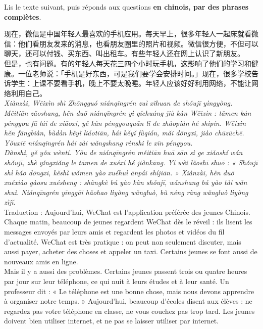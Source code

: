\documentclass[11pt]{article}
\begin{document}
\begin{exercice}
Lis le texte suivant, puis réponds aux questions \textbf{en chinois, par des phrases complètes}.

\begin{textebox}[微信和中国年轻人]
现在，微信是中国年轻人最喜欢的手机应用。每天早上，很多年轻人一起床就看微信：他们看朋友发来的消息，也看朋友圈里的照片和视频。微信很方便，不但可以聊天，还可以付钱、买东西、叫出租车。有些年轻人还在网上认识了新朋友。\\
但是，也有问题。有的年轻人每天花三四个小时玩手机，这影响了他们的学习和健康。一位老师说：「手机是好东西，可是我们要学会安排时间。」现在，很多学校告诉学生：上课不要看手机，晚上不要太晚睡。年轻人应该好好利用网络，不能让网络利用自己。\\
\emph{Xiànzài, Wēixìn shì Zhōngguó niánqīngrén zuì xǐhuan de shǒujī yìngyòng. Měitiān zǎoshang, hěn duō niánqīngrén yì qǐchuáng jiù kàn Wēixìn : tāmen kàn péngyou fā lái de xiāoxi, yě kàn péngyouquān lǐ de zhàopiàn hé shìpín. Wēixìn hěn fāngbiàn, bùdàn kěyǐ liáotiān, hái kěyǐ fùqián, mǎi dōngxi, jiào chūzūchē. Yǒuxiē niánqīngrén hái zài wǎngshang rènshi le xīn péngyou.}\\\emph{Dànshì, yě yǒu wèntí. Yǒu de niánqīngrén měitiān huā sān sì ge xiǎoshí wán shǒujī, zhè yǐngxiǎng le tāmen de xuéxí hé jiànkāng. Yí wèi lǎoshī shuō : « Shǒujī shì hǎo dōngxi, kěshì wǒmen yào xuéhuì ānpái shíjiān. » Xiànzài, hěn duō xuéxiào gàosu xuésheng : shàngkè bú yào kàn shǒujī, wǎnshang bú yào tài wǎn shuì. Niánqīngrén yīnggāi hǎohao lìyòng wǎngluò, bù néng ràng wǎngluò lìyòng zìjǐ.}\\
Traduction : Aujourd'hui, WeChat est l'application préférée des jeunes Chinois. Chaque matin, beaucoup de jeunes regardent WeChat dès le réveil : ils lisent les messages envoyés par leurs amis et regardent les photos et vidéos du fil d'actualité. WeChat est très pratique : on peut non seulement discuter, mais aussi payer, acheter des choses et appeler un taxi. Certains jeunes se font aussi de nouveaux amis en ligne.\\
Mais il y a aussi des problèmes. Certains jeunes passent trois ou quatre heures par jour sur leur téléphone, ce qui nuit à leurs études et à leur santé. Un professeur dit : « Le téléphone est une bonne chose, mais nous devons apprendre à organiser notre temps. » Aujourd'hui, beaucoup d'écoles disent aux élèves : ne regardez pas votre téléphone en classe, ne vous couchez pas trop tard. Les jeunes doivent bien utiliser internet, et ne pas se laisser utiliser par internet.
\end{textebox}


\end{exercice}
\end{document}
